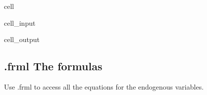 \documentclass[letterpaper,10pt,english]{jupyterBook}
\begin{document}
\begin{sphinxuseclass}{cell}\begin{sphinxVerbatimInput}

\begin{sphinxuseclass}{cell_input}
\begin{sphinxVerbatim}[commandchars=\\\{\}]
\PYG{p}{[}\PYG{p}{]}
\end{sphinxVerbatim}

\end{sphinxuseclass}\end{sphinxVerbatimInput}
\begin{sphinxVerbatimOutput}

\begin{sphinxuseclass}{cell_output}
\begin{sphinxVerbatim}
\end{sphinxVerbatim}

\end{sphinxuseclass}\end{sphinxVerbatimOutput}

\end{sphinxuseclass}

\subsection{.frml The formulas}
\label{\detokenize{content/notebooks/modelflow_features:frml-the-formulas}}
\sphinxAtStartPar
Use .frml to access all the equations for the endogenous variables.
\end{document}
